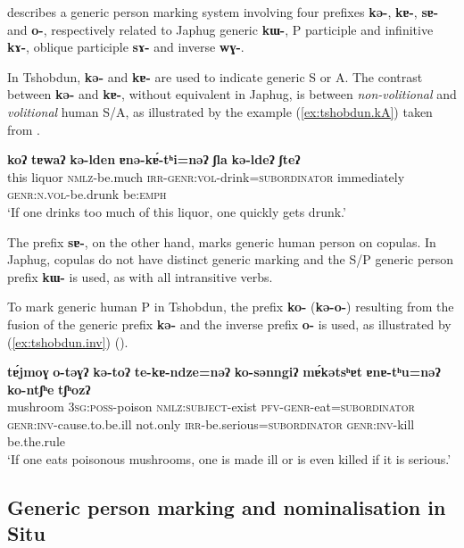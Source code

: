 \documentclass[oneside,a4paper,11pt]{article}
\newcommand{\ipa}[1]{\textbf{\phon\mbox{#1}}} %
\newcommand{\refb}[1]{(\ref{#1})}
\begin{document}
\citet{sun14generic} describes a generic person marking system involving four prefixes \ipa{kə-}, \ipa{kɐ-}, \ipa{sɐ-} and \ipa{o-}, respectively related to Japhug generic  \ipa{kɯ-}, P participle and infinitive \ipa{kɤ-}, oblique participle \ipa{sɤ-} and inverse \ipa{wɣ-}. 

In Tshobdun, \ipa{kə-} and \ipa{kɐ-} are used to indicate generic S or A. The contrast between \ipa{kə-} and \ipa{kɐ-}, without equivalent in Japhug, is between 	 \textit{non-volitional} and  \textit{volitional} human S/A, as illustrated by the example \refb{ex:tshobdun.kA} taken from \citet[238]{sun14generic}.
 \begin{exe}
\ex \label{ex:tshobdun.kA}
\gll
\ipa{koʔ}  	\ipa{tɐwaʔ}  	\ipa{kə-lden}  	\ipa{ɐnə-kɐ́-tʰi=nəʔ}  	\ipa{ʃla}  	\ipa{kə-ldeʔ}  	\ipa{ʃteʔ}   \\
 this liquor \textsc{nmlz}-be.much \textsc{irr-genr:vol}-drink=\textsc{subordinator}  immediately \textsc{genr:n.vol}-be.drunk be:\textsc{emph} \\
\glt  ‘If one drinks too much of this liquor, one quickly gets drunk.’ 
 \end{exe}
 
 The prefix \ipa{sɐ-}, on the other hand, marks generic human person on copulas. In Japhug, copulas do not have distinct generic marking and the S/P generic person prefix \ipa{kɯ-} is used, as with all intransitive verbs.
 
To mark generic human P in Tshobdun, the prefix \ipa{ko-} (\ipa{kə-o-}) resulting from the  fusion  of  the generic prefix \ipa{kə-} and the inverse prefix \ipa{o-} is used, as illustrated by \refb{ex:tshobdun.inv} (\citealt[240]{sun14generic}).

 \begin{exe}
\ex \label{ex:tshobdun.inv}
\gll
\ipa{tɐ́jmoɣ}  	\ipa{o-təɣʔ}  	\ipa{kə-toʔ}  	\ipa{te-kɐ-ndze=nəʔ}  	\ipa{ko-sənngiʔ}  	\ipa{mɐ́kətsʰɐt}  	\ipa{ɐnɐ-tʰu=nəʔ}  	\ipa{ko-ntʃʰe}  	\ipa{tʃʰozʔ}  \\
 mushroom \textsc{3sg:poss}-poison \textsc{nmlz:subject}-exist \textsc{pfv-genr}-eat=\textsc{subordinator}  \textsc{genr:inv}-cause.to.be.ill not.only \textsc{irr}-be.serious=\textsc{subordinator}   \textsc{genr:inv}-kill be.the.rule \\
\glt ‘If one eats poisonous mushrooms, one is made ill or is even killed if it is serious.’ 
 \end{exe}
 
 
\subsection{Generic person marking and nominalisation in Situ} \label{situ.nmlz}
\end{document}
